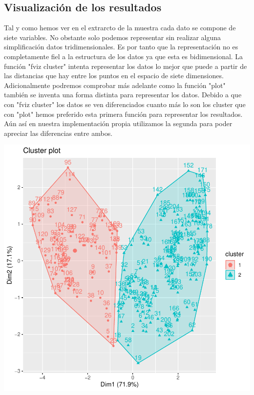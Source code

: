 \documentclass [a4paper] {article}
\begin{document}
\newpage
\subsection{Visualización de los resultados}
Tal y como hemos ver en el extrarcto de la muestra cada dato se compone de siete variables.
No obstante solo podemos representar sin realizar alguna simplificación datos tridimensionales.
Es por tanto que la representación no es completamente fiel a la estructura de los datos ya que esta es bidimensional.
La función "fviz cluster" intenta representar los datos lo mejor que puede a partir de las distancias que hay entre los puntos en el espacio de siete dimensiones.
Adicionalmente podremos comprobar más adelante como la función "plot" también se inventa una forma distinta para representar los datos.
Debido a que con "fviz cluster" los datos se ven diferenciados cuanto más lo son los cluster que con "plot" hemos preferido esta primera función para representar los resultados.
Aún así en nuestra implementación propia utilizamos la segunda para poder apreciar las diferencias entre ambos.
\begin{center}
\includegraphics{entrega-kmeans_show_resultse}
\end{center}

\newpage
\end{document}
